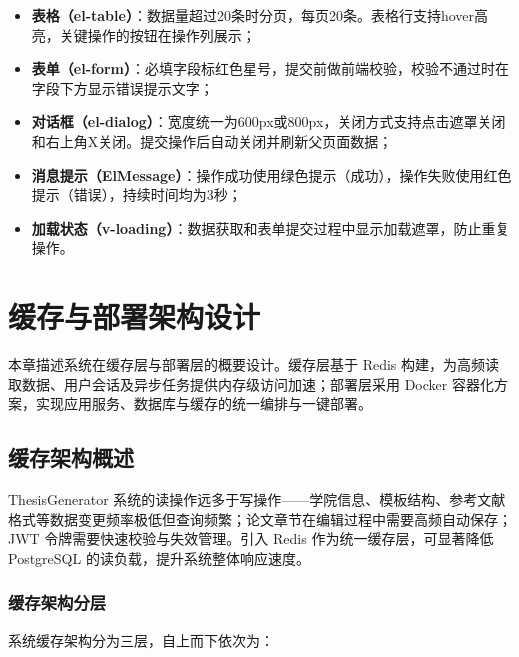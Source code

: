 \documentclass{../softeng}
\begin{document}
\begin{itemize}
    \item \textbf{表格（el-table）}：数据量超过20条时分页，每页20条。表格行支持hover高亮，关键操作的按钮在操作列展示；
    \item \textbf{表单（el-form）}：必填字段标红色星号，提交前做前端校验，校验不通过时在字段下方显示错误提示文字；
    \item \textbf{对话框（el-dialog）}：宽度统一为600px或800px，关闭方式支持点击遮罩关闭和右上角X关闭。提交操作后自动关闭并刷新父页面数据；
    \item \textbf{消息提示（ElMessage）}：操作成功使用绿色提示（成功），操作失败使用红色提示（错误），持续时间均为3秒；
    \item \textbf{加载状态（v-loading）}：数据获取和表单提交过程中显示加载遮罩，防止重复操作。
\end{itemize}

\section{缓存与部署架构设计}

本章描述系统在缓存层与部署层的概要设计。缓存层基于 Redis 构建，为高频读取数据、用户会话及异步任务提供内存级访问加速；部署层采用 Docker 容器化方案，实现应用服务、数据库与缓存的统一编排与一键部署。

\subsection{缓存架构概述}

ThesisGenerator 系统的读操作远多于写操作——学院信息、模板结构、参考文献格式等数据变更频率极低但查询频繁；论文章节在编辑过程中需要高频自动保存；JWT 令牌需要快速校验与失效管理。引入 Redis 作为统一缓存层，可显著降低 PostgreSQL 的读负载，提升系统整体响应速度。

\subsubsection{缓存架构分层}

系统缓存架构分为三层，自上而下依次为：
\end{document}
